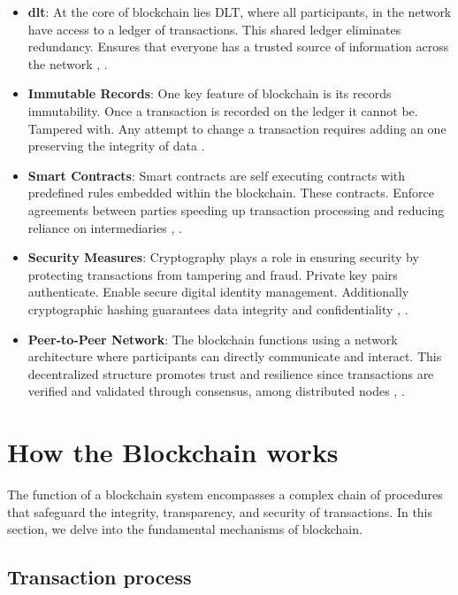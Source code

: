 \begin{itemize}
  \item \textbf{\gls{dlt}}: At the core of blockchain lies DLT, where all participants, in the network have access to a ledger of transactions. 
  This shared ledger eliminates redundancy. Ensures that everyone has a trusted source of information across the network \cite{ibm_blockchain}, \cite{9752154}.
  \item \textbf{Immutable Records}: One key feature of blockchain is its records immutability. Once a transaction is recorded on the ledger it cannot be. Tampered with. 
  Any attempt to change a transaction requires adding an one preserving the integrity of data \cite{ibm_blockchain}.
  \item \textbf{Smart Contracts}: Smart contracts are self executing contracts with predefined rules embedded within the blockchain. These contracts. Enforce agreements 
  between parties speeding up transaction processing and reducing reliance on intermediaries \cite{ibm_blockchain}, \cite{9036241}.
  \item \textbf{Security Measures}:  Cryptography plays a role in ensuring security by protecting transactions from tampering and fraud. Private key pairs authenticate. 
  Enable secure digital identity management. Additionally cryptographic hashing guarantees data integrity and confidentiality \cite{9596538}, \cite{9036241}.
  \item \textbf{Peer-to-Peer Network}: The blockchain functions using a network architecture where participants can directly communicate and interact. This decentralized 
  structure promotes trust and resilience since transactions are verified and validated through consensus, among distributed nodes \cite{9752154}, \cite{9036241}.
\end{itemize}

\section{How the Blockchain works}

The function of a blockchain system encompasses a complex chain of procedures that safeguard the  integrity, transparency, and security of transactions. In this section, 
we delve into the fundamental mechanisms of blockchain.

\subsection{Transaction process}

